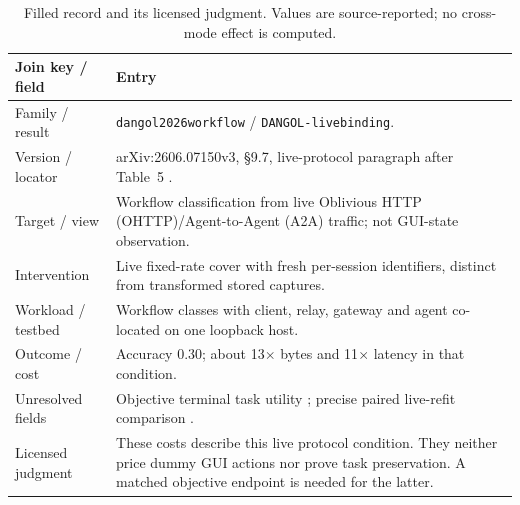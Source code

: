 \begin{table}[t]\centering\footnotesize
\caption{Filled record and its licensed judgment. Values are source-reported; no cross-mode effect is computed.}\label{tab:result-lineage}
\begin{tabularx}{\columnwidth}{@{}p{}Y@{}}\toprule
Join key / field & Entry\\\midrule
Family / result & \texttt{dangol2026workflow} / \texttt{DANGOL-livebinding}.\\
Version / locator & arXiv:2606.07150v3, \S9.7, live-protocol paragraph after Table~5 \cite{dangol2026workflow}.\\
Target / view & Workflow classification from live Oblivious HTTP (OHTTP)/Agent-to-Agent (A2A) traffic; not GUI-state observation.\\
Intervention & Live fixed-rate cover with fresh per-session identifiers, distinct from transformed stored captures.\\
Workload / testbed & Workflow classes with client, relay, gateway and agent co-located on one loopback host.\\
Outcome / cost & Accuracy 0.30; about 13$\times$ bytes and 11$\times$ latency in that condition.\\
Unresolved fields & Objective terminal task utility \NRR{}; precise paired live-refit comparison \NRV{}.\\
Licensed judgment & These costs describe this live protocol condition. They neither price dummy GUI actions nor prove task preservation. A matched objective endpoint is needed for the latter.\\\bottomrule
\end{tabularx}\end{table}
